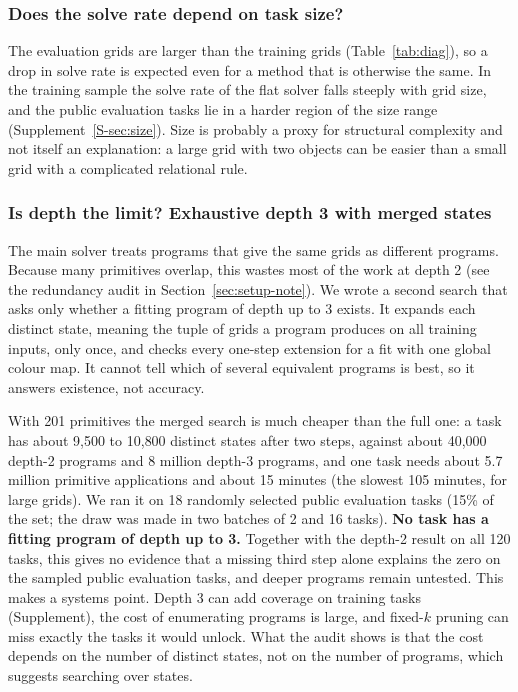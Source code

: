 \documentclass[sigconf,nonacm]{acmart}
\begin{document}
\subsubsection{Does the solve rate depend on task size?}

The evaluation grids are larger than the training grids (Table~\ref{tab:diag}), so a drop in solve rate is expected even for a method that is otherwise the same. In the training sample the solve rate of the flat solver falls steeply with grid size, and the public evaluation tasks lie in a harder region of the size range (Supplement~\ref{S-sec:size}). Size is probably a proxy for structural complexity and not itself an explanation: a large grid with two objects can be easier than a small grid with a complicated relational rule.



\subsubsection{Is depth the limit? Exhaustive depth 3 with merged states}
\label{sec:dedup}

The main solver treats programs that give the same grids as different programs. Because many primitives overlap, this wastes most of the work at depth 2 (see the redundancy audit in Section~\ref{sec:setup-note}). We wrote a second search that asks only whether a fitting program of depth up to 3 exists. It expands each distinct state, meaning the tuple of grids a program produces on all training inputs, only once, and checks every one-step extension for a fit with one global colour map. It cannot tell which of several equivalent programs is best, so it answers existence, not accuracy.

With 201 primitives the merged search is much cheaper than the full one: a task has about 9{,}500 to 10{,}800 distinct states after two steps, against about 40{,}000 depth-2 programs and 8 million depth-3 programs, and one task needs about 5.7 million primitive applications and about 15 minutes (the slowest 105 minutes, for large grids). We ran it on 18 randomly selected public evaluation tasks (15\% of the set; the draw was made in two batches of 2 and 16 tasks). \textbf{No task has a fitting program of depth up to 3.} Together with the depth-2 result on all 120 tasks, this gives no evidence that a missing third step alone explains the zero on the sampled public evaluation tasks, and deeper programs remain untested. This makes a systems point. Depth 3 can add coverage on training tasks (Supplement), the cost of enumerating programs is large, and fixed-$k$ pruning can miss exactly the tasks it would unlock. What the audit shows is that the cost depends on the number of distinct states, not on the number of programs, which suggests searching over states.
\end{document}
